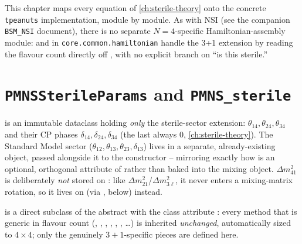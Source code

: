 \label{ch:sterile-implementation}

This chapter maps every equation of \cref{ch:sterile-theory} onto the
concrete \texttt{tpeanuts} implementation, module by module. As with NSI
(see the companion \texttt{BSM\_NSI} document), there is no separate
$N=4$-specific Hamiltonian-assembly module: 
and  in \texttt{core.common.hamiltonian}
handle the 3+1 extension by reading the flavour count directly off
, with no explicit branch on ``is this
sterile.''

\section{\texttt{PMNSSterileParams} and \texttt{PMNS\_sterile}}


\begin{implbox}
 is an immutable dataclass holding \emph{only}
the sterile-sector extension: $\theta_{14},\theta_{24},\theta_{34}$ and
their CP phases $\delta_{14},\delta_{24},\delta_{34}$ (the last always
$0$, \cref{ch:sterile-theory}). The Standard Model sector
($\theta_{12},\theta_{13},\theta_{23},\delta_{13}$) lives in a separate,
already-existing  object, passed alongside it to the
 constructor -- mirroring exactly how
 is an optional, orthogonal attribute of
 rather than baked into the mixing object.
$\Delta m^2_{41}$ is deliberately \emph{not} stored on
: like $\Delta m^2_{21}$/$\Delta m^2_{3\ell}$,
it never enters a mixing-matrix rotation, so it lives on
 (via , below)
instead.

 is a direct subclass of the abstract
 with the class attribute
: every method that is generic in flavour count
(, , , ,
, , \dots) is inherited
\emph{unchanged}, automatically sized to $4\times4$; only the genuinely
$3{+}1$-specific pieces are defined here.
\end{implbox}

